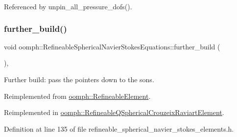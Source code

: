 Referenced by unpin\+\_\+all\+\_\+pressure\+\_\+dofs().

\mbox{\label{classoomph_1_1RefineableSphericalNavierStokesEquations_acb7ba9bdf812cecd8d1d503000227856}} 
\subsubsection{\texorpdfstring{further\+\_\+build()}{further\_build()}}
{\footnotesize\ttfamily void oomph\+::\+Refineable\+Spherical\+Navier\+Stokes\+Equations\+::further\+\_\+build (\begin{DoxyParamCaption}{ }\end{DoxyParamCaption})\hspace{0.3cm}{\ttfamily [inline]}, {\ttfamily [virtual]}}



Further build\+: pass the pointers down to the sons. 



Reimplemented from \hyperlink{classoomph_1_1RefineableElement_a26628ce36dfad028686adeb4694a9ef3}{oomph\+::\+Refineable\+Element}.



Reimplemented in \hyperlink{classoomph_1_1RefineableQSphericalCrouzeixRaviartElement_a6a67cbea725615b74a5f3a92aa60ebd2}{oomph\+::\+Refineable\+Q\+Spherical\+Crouzeix\+Raviart\+Element}.



Definition at line 135 of file refineable\+\_\+spherical\+\_\+navier\+\_\+stokes\+\_\+elements.\+h.



